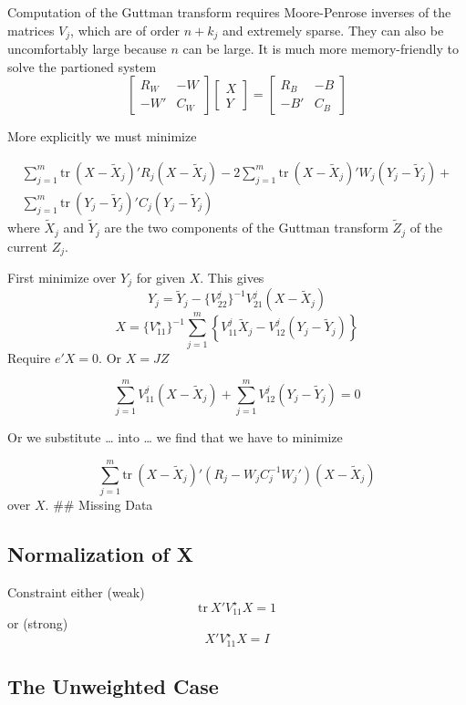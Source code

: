 \documentclass[
  12pt,
]{article}
\begin{document}
Computation of the Guttman transform requires Moore-Penrose inverses of the
matrices \(V_j\), which are of order \(n+k_j\) and extremely sparse. They can also be uncomfortably large because \(n\) can be large. It is much more memory-friendly to solve the partioned system
\[
\begin{bmatrix}
R_W&-W\\
-W'&C_W
\end{bmatrix}
\begin{bmatrix}X\\Y\end{bmatrix}=\begin{bmatrix}
R_B&-B\\
-B'&C_B
\end{bmatrix}
\]

More explicitly we must minimize

\begin{multline}
\sum_{j=1}^m\text{tr}\ (X-\tilde X_j)'R_j(X-\tilde X_j)-2\sum_{j=1}^m\text{tr}\ (X-\tilde X_j)'W_j(Y_j-\tilde Y_j)+\\
\sum_{j=1}^m\text{tr}\ (Y_j-\tilde Y_j)'C_j(Y_j-\tilde Y_j)
\end{multline}
where \(\tilde X_j\) and \(\tilde Y_j\) are the two components of the Guttman
transform \(\tilde Z_j\) of the current \(Z_j\).

First minimize over \(Y_j\) for given \(X\). This gives
\[
Y_j=\tilde Y_j-\{V_{22}^j\}^{-1}V_{21}^j(X-\tilde X_j)
\]
\[
X = \{V_{11}^\star\}^{-1}\sum_{j=1}^m\left\{V_{11}^j\tilde X_j-V_{12}^j(Y_j-\tilde Y_j)\right\}
\]
Require \(e'X=0\). Or \(X=JZ\)

\[
\sum_{j=1}^m V_{11}^j(X-\tilde X_j)+\sum_{j=1}^mV_{12}^j(Y_j-\tilde Y_j)= 0
\]

Or we substitute \ldots{} into \ldots{} we find that we have to minimize

\[
\sum_{j=1}^m\text{tr}\ (X-\tilde X_j)'(R_j-W_jC_j^{-1}W_j')(X-\tilde X_j)
\]
over \(X\).
\#\# Missing Data

\subsection{Normalization of X}\label{normalization-of-x}

Constraint either (weak)
\[
\text{tr}\ X'V_{11}^\star X = 1
\]
or (strong)
\[
X'V_{11}^\star X = I
\]

\subsection{The Unweighted Case}\label{the-unweighted-case}
\end{document}

